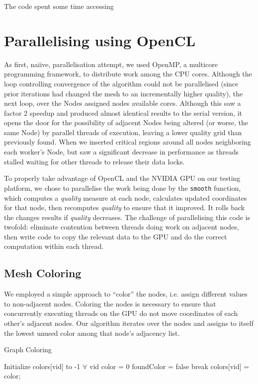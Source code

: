 \documentclass[a4paper,11pt, twocolumn]{article}
\begin{document}
The code spent some time accessing 

\section{Parallelising using OpenCL}
As first, naiive, parallelisation attempt, we used OpenMP, a multicore programming framework, to distribute work among the CPU cores.  Although the loop controlling convergence of the algorithm could not be parallelised (since prior iterations had changed the mesh to an incrementally higher quality), the next loop, over the Nodes assigned nodes available cores.  Although this saw a factor 2 speedup and produced almost identical results to the serial version, it opens the door for the possibility of adjacent Nodes being altered (or worse, the same Node) by parallel threads of execution, leaving a lower quality grid than previously found.  When we inserted critical regions around all nodes neighboring each worker's Node, but saw a significant decrease in performance as threads stalled waiting for other threads to release their data locks.

To properly take advantage of OpenCL and the NVIDIA GPU on our testing platform, we chose to parallelise the work being done by the \verb+smooth+ function, which computes a \emph{quality} measure at each node, calculates updated coordinates for that node, then recomputes \emph{quality} to ensure that it improved.  It rolls back the changes results if \emph{quality} decreases.  The challenge of parallelising this code is twofold: eliminate contention between threads doing work on adjacent nodes, then write code to copy the relevant data to the GPU and do the correct computation within each thread.

\subsection{Mesh Coloring}
We employed a simple approach to ``color'' the nodes, i.e. assign different values to non-adjacent nodes.  Coloring the nodes is necessary to ensure that concurrently executing threads on the GPU do not move coordinates of each other's adjacent nodes.  Our algorithm iterates over the nodes and assigns to itself the lowest unused color among that node's adjacency list.
\begin{algorithm}[H]
\caption{Graph Coloring}
\label{al:color}
\begin{algorithmic}[1]
\STATE Initialize colors[vid] to -1 $\forall$ vid
  \STATE color = 0
      \STATE foundColor = false
      \STATE break
    \ENDIF
  \ENDFOR
  \STATE colors[vid] = color;
\ENDFOR
\end{algorithmic}
\end{algorithm}
\end{document}
